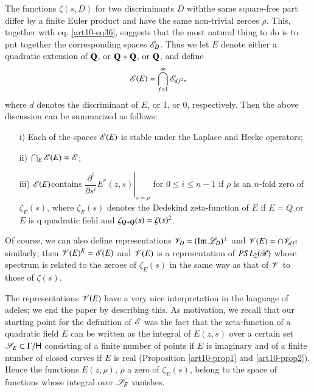 The functions $\zeta(s,D)$ for two discriminants $D$ withthe same square-free part differ by a finite Euler product and have the same non-trivial zeroes $\rho$. This, together with eq. \eqref{art10-eq36}, suggests that the most natural thing to do is to put together the corresponding spaces $\mathscr{E}_D$. Thus we let $E$ denote either a quadratic extension of $\mathbf{Q}$, or $\mathbf{Q}+ \mathbf{Q}$, or $\mathbf{Q}$, and define 
$$
\mathscr{E}(E) = \bigcap^\infty_{f=1} \mathscr{E}_{df^2},
$$
where $d$ denotes the discriminant of $E$, or 1, or 0, respectively. Then the above discussion can be summarized as follows:
\begin{itemize}
\item[i)] Each of the spaces $\mathscr{E} (E)$ is stable under the Laplace and Hecke operators;

\item[ii)] $\bigcap_E \mathscr{E} (E) = \mathscr{E}$;

\item[iii)] $\mathscr{E} (E)$\pageoriginale contains $\left. \dfrac{\partial^i}{\partial s^i} E^\ast (z,s) \right|_{s = \rho}$ for $0 \leqslant i \leqslant n -1$ if $\rho$ is an $n$-fold zero of $\zeta_E(s)$, where $\zeta_E (s)$ denotes the Dedekind zeta-function of $E$ if $E=Q$ or $E$  is q quadratic field and $\zeta_{\mathbf{Q} + \mathbf{Q}} (s) = \zeta(s)^2$.
\end{itemize}
Of course, we can also define representations $\mathscr{V}_D = (\operatorname{Im} \mathscr{L}_D)^\perp$ and $\mathscr{V} (E)= \cap \mathscr{V}_{df^2}$ similarly; then $\mathscr{V} (E)^K = \mathscr{E} (E)$ and $\mathscr{V} (E)$ is a representation of $PSL_2 (\mathscr{R})$ whose spectrum is related to the zeroes of $\zeta_E(s)$ in the same way as that of $\mathscr{V}$ to those of $\zeta(s)$. 

The representations $\mathscr{V} (E)$ have a very nice interpretation in the language of adeles; we end the paper by describing this. As motivation, we recall that our starting point for the definition of $\mathscr{E}$ was the fact that the zeta-function of a quadratic field $E$ can be written as the integral of $E (z,s)$ over a certain set $\mathscr{S}_E \subset \Gamma / \mathsf{H}$ consisting of a finite number of points if $E$ is imaginary and of a finite number of closed curves if $E$ is real (Proposition \ref{art10-prop1} and \ref{art10-prop2}). Hence the functions $E(z, \rho)$, $\rho$  a zero of $\zeta_E (s)$, belong to the space of functions whose integral over $\mathscr{S}_E$ vanishes. 

